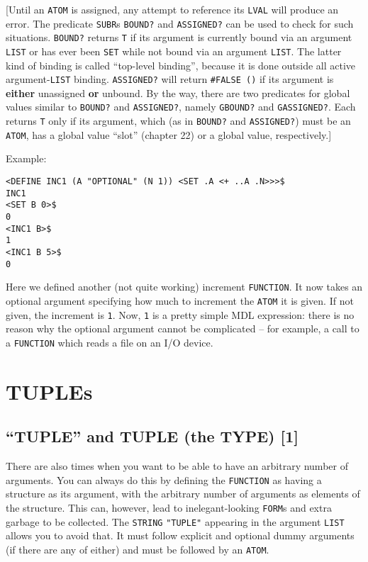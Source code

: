 \documentclass[a4paper]{scrbook}
\begin{document}
{[}Until an \texttt{ATOM} is assigned, any attempt to reference its \texttt{LVAL} will produce an error. The predicate
\texttt{SUBR}s \texttt{BOUND?} and \texttt{ASSIGNED?} can be
used to check for such situations. \texttt{BOUND?} returns \texttt{T} if its argument is currently bound via an argument
\texttt{LIST} or has ever been \texttt{SET} while not bound via an argument \texttt{LIST}. The latter kind of binding is
called ``top-level binding'', because it is done outside all active argument-\texttt{LIST} binding. \texttt{ASSIGNED?} will
return \texttt{\#FALSE\ ()} if its argument is \textbf{either} unassigned \textbf{or} unbound. By the way, there are two
predicates for global values similar to \texttt{BOUND?} and \texttt{ASSIGNED?}, namely
\texttt{GBOUND?} and \texttt{GASSIGNED?}. Each returns \texttt{T}
only if its argument, which (as in \texttt{BOUND?} and \texttt{ASSIGNED?}) must be an \texttt{ATOM}, has a global value
``slot'' (chapter 22) or a global value, respectively.{]}

Example:

\begin{verbatim}
<DEFINE INC1 (A "OPTIONAL" (N 1)) <SET .A <+ ..A .N>>>$
INC1
<SET B 0>$
0
<INC1 B>$
1
<INC1 B 5>$
0
\end{verbatim}

Here we defined another (not quite working) increment \texttt{FUNCTION}. It now takes an optional argument specifying how
much to increment the \texttt{ATOM} it is given. If not given, the increment is \texttt{1}. Now, \texttt{1} is a pretty
simple MDL expression: there is no reason why the optional argument cannot be complicated -- for example, a call to a
\texttt{FUNCTION} which reads a file on an I/O device.

\section{TUPLEs}\label{tuples}

\subsection{\texorpdfstring{``TUPLE'' and TUPLE (the TYPE)
{[}1{]}}{9.2.1. TUPLE and TUPLE (the TYPE) {[}1{]}}}\label{tuple-and-tuple-the-type-1}

There are also times when you want to be able to have an arbitrary number of arguments. You can always do this by defining
the \texttt{FUNCTION} as having a structure as its argument, with the arbitrary number of arguments as elements of the
structure. This can, however, lead to inelegant-looking \texttt{FORM}s and extra garbage to be collected. The
\texttt{STRING} \texttt{"TUPLE"}  appearing in the argument \texttt{LIST} allows you to
avoid that. It must follow explicit and optional dummy arguments (if there are any of either) and must be followed by an
\texttt{ATOM}.
\end{document}
